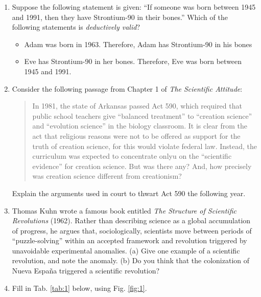 \documentclass[10pt]{article}
\begin{document}
\begin{enumerate}
\begin{enumerate}
\end{enumerate}
\item Suppose the following statement is given: ``If someone was born between 1945 and 1991, then they have Strontium-90 in their bones.''  Which of the following statements is \textit{deductively valid}?
\begin{itemize}
\item Adam was born in 1963.  Therefore, Adam has Strontium-90 in his bones
\item Eve has Strontium-90 in her bones.  Therefore, Eve was born between 1945 and 1991.
\end{itemize}
\item Consider the following passage from Chapter 1 of \textit{The Scientific Attitude}:
\begin{quotation}
In 1981, the state of Arkansas passed Act 590, which required that public school teachers give ``balanced treatment'' to ``creation science'' and ``evolution science'' in the biology classroom.  It is clear from the act that religious reasons were not to be offered as support for the truth of creation science, for this would violate federal law.  Instead, the curriculum was expected to concentrate onlyu on the ``scientific evidence'' for creation science.  But was there any?  And, how precisely was creation science different from creationism?
\end{quotation}
Explain the arguments used in court to thwart Act 590 the following year. \\ \vspace{1cm}
\item Thomas Kuhn wrote a famous book entitled \textit{The Structure of Scientific Revolutions} (1962).  Rather than describing science as a global accumulation of progress, he argues that, sociologically, scientists move between periods of ``puzzle-solving'' within an accepted framework and revolution triggered by unavoidable experimental anomalies. (a) Give one example of a scientific revolution, and note the anomaly. (b) Do you think that the colonization of Nueva Espa\~{n}a triggered a scientific revolution? \\ \vspace{2cm}
\item Fill in Tab. \ref{tab:1} below, using Fig. \ref{fig:1}.
\begin{figure}[ht]
\centering
\begin{subfigure}{0.15\textwidth}

\end{subfigure}
\end{figure}
\end{enumerate}
\end{document}
